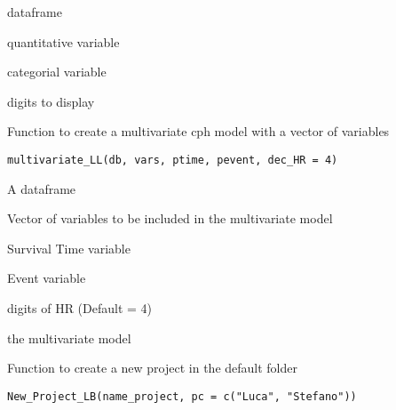 \documentclass[a4paper]{book}
\begin{document}
%
\begin{Arguments}
\begin{ldescription}
\item[\code{data}] dataframe

\item[\code{var\_quant}] quantitative variable

\item[\code{var\_cat}] categorial variable

\item[\code{digits}] digits to display
\end{ldescription}
\end{Arguments}
%
\begin{Description}
Function to create a multivariate cph model with a vector of variables
\end{Description}
%
\begin{Usage}
\begin{verbatim}
multivariate_LL(db, vars, ptime, pevent, dec_HR = 4)
\end{verbatim}
\end{Usage}
%
\begin{Arguments}
\begin{ldescription}
\item[\code{db}] A dataframe

\item[\code{vars}] Vector of variables to be included in the multivariate model

\item[\code{ptime}] Survival Time variable

\item[\code{pevent}] Event variable

\item[\code{dec\_HR}] digits of HR (Default = 4)
\end{ldescription}
\end{Arguments}
%
\begin{Value}
the multivariate model
\end{Value}
%
\begin{Description}
Function to create a new project in the default folder
\end{Description}
%
\begin{Usage}
\begin{verbatim}
New_Project_LB(name_project, pc = c("Luca", "Stefano"))
\end{verbatim}
\end{Usage}
\end{document}
